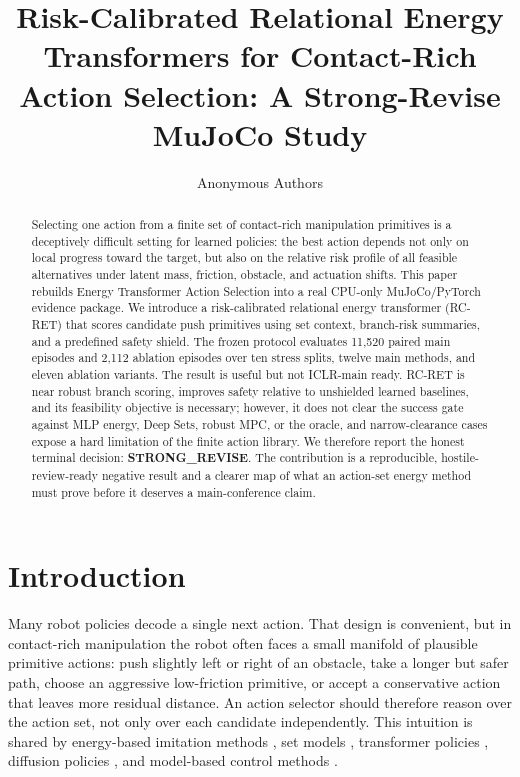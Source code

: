 \documentclass{article}
\title{Risk-Calibrated Relational Energy Transformers for Contact-Rich Action Selection: A Strong-Revise MuJoCo Study}
\author{Anonymous Authors}
\newcommand{\method}{RC-RET}
\begin{document}
\maketitle

\begin{abstract}
Selecting one action from a finite set of contact-rich manipulation primitives is a deceptively difficult setting for learned policies: the best action depends not only on local progress toward the target, but also on the relative risk profile of all feasible alternatives under latent mass, friction, obstacle, and actuation shifts.  This paper rebuilds Energy Transformer Action Selection into a real CPU-only MuJoCo/PyTorch evidence package.  We introduce a risk-calibrated relational energy transformer (\method) that scores candidate push primitives using set context, branch-risk summaries, and a predefined safety shield.  The frozen protocol evaluates 11,520 paired main episodes and 2,112 ablation episodes over ten stress splits, twelve main methods, and eleven ablation variants.  The result is useful but not ICLR-main ready.  \method{} is near robust branch scoring, improves safety relative to unshielded learned baselines, and its feasibility objective is necessary; however, it does not clear the success gate against MLP energy, Deep Sets, robust MPC, or the oracle, and narrow-clearance cases expose a hard limitation of the finite action library.  We therefore report the honest terminal decision: \textbf{STRONG\_REVISE}.  The contribution is a reproducible, hostile-review-ready negative result and a clearer map of what an action-set energy method must prove before it deserves a main-conference claim.
\end{abstract}

\section{Introduction}

Many robot policies decode a single next action.  That design is convenient, but in contact-rich manipulation the robot often faces a small manifold of plausible primitive actions: push slightly left or right of an obstacle, take a longer but safer path, choose an aggressive low-friction primitive, or accept a conservative action that leaves more residual distance.  An action selector should therefore reason over the action set, not only over each candidate independently.  This intuition is shared by energy-based imitation methods \citep{lecun2006tutorial,florence2022implicit}, set models \citep{zaheer2017deep,lee2019set}, transformer policies \citep{vaswani2017attention,zhao2023learning}, diffusion policies \citep{chi2023diffusion}, and model-based control methods \citep{williams2017mppi,chua2018pets}.
\end{document}
